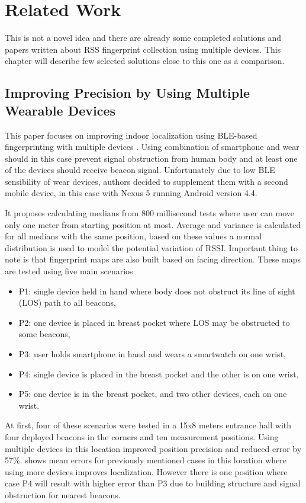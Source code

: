 \chapter{Related Work}\label{sec:RelatedWork}
This is not a novel idea and there are already some completed solutions and papers written about RSS fingerprint collection using multiple devices. This chapter will describe few selected solutions close to this one as a comparison.

\section{Improving Precision by Using Multiple Wearable Devices}\label{sec:IPUMWD}
This paper focuses on improving indoor localization using BLE-based fingerprinting with multiple devices \cite{IPBLEIUMWD}. Using combination of smartphone and wear should in this case prevent signal obstruction from human body and at least one of the devices should receive beacon signal. Unfortunately due to low BLE sensibility of wear devices, authors decided to supplement them with a second mobile device, in this case with Nexus 5 running Android version 4.4.

It proposes calculating medians from 800 millisecond tests where user can move only one meter from starting position at most. Average and variance is calculated for all medians with the same position, based on these values a normal distribution is used to model the potential variation of RSSI. Important thing to note is that fingerprint maps are also built based on facing direction. These maps are tested using five main scenarios

\begin{itemize}
	\item P1: single device held in hand where body does not obstruct its line of sight (LOS) path to all beacons,
	\item P2: one device is placed in breast pocket where LOS may be obstructed to some beacons,
	\item P3: user holds smartphone in hand and wears a smartwatch on one wrist,
	\item P4: single device is placed in the breast pocket and the other is on one wrist,
	\item P5: one device is in the breast pocket, and two other devices, each on one wrist.
\end{itemize} 

At first, four of these scenarios were tested in a 15x8 meters entrance hall with four deployed beacons in the corners and ten measurement positions. Using multiple devices in this location improved position precision and reduced error by 57\%.  shows mean errors for previously mentioned cases in this location where using more devices improves localization. However there is one position where case P4 will result with higher error than P3 due to building structure and signal obstruction for nearest beacons.

